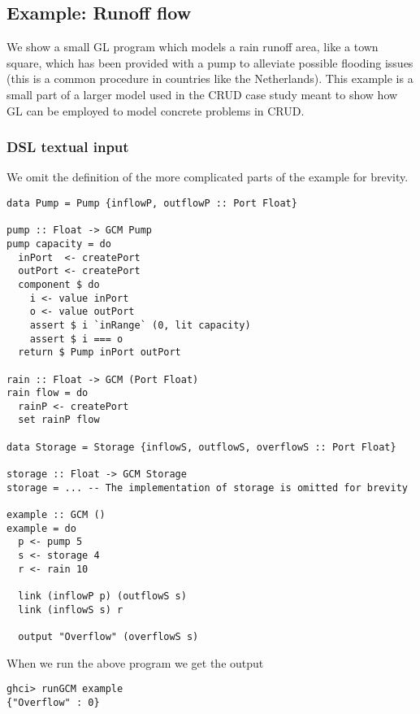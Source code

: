 \subsection{Example: Runoff flow}\label{example-runoff-flow}

We show a small GL program which models a rain runoff area, like a
town square, which has been provided with a pump to alleviate possible
flooding issues (this is a common procedure in countries like the
Netherlands).
%
This example is a small part of a larger model used in the CRUD case
study meant to show how GL can be employed to model concrete problems
in CRUD.

\subsubsection{DSL textual input}\label{example-runoff-flow-dsl-textual-input}

We omit the definition of the more complicated parts of the example
for brevity.




\begin{verbatim}
data Pump = Pump {inflowP, outflowP :: Port Float}

pump :: Float -> GCM Pump
pump capacity = do
  inPort  <- createPort
  outPort <- createPort
  component $ do
    i <- value inPort
    o <- value outPort
    assert $ i `inRange` (0, lit capacity)
    assert $ i === o
  return $ Pump inPort outPort

rain :: Float -> GCM (Port Float)
rain flow = do
  rainP <- createPort
  set rainP flow

data Storage = Storage {inflowS, outflowS, overflowS :: Port Float}

storage :: Float -> GCM Storage
storage = ... -- The implementation of storage is omitted for brevity

example :: GCM ()
example = do
  p <- pump 5
  s <- storage 4
  r <- rain 10

  link (inflowP p) (outflowS s)
  link (inflowS s) r

  output "Overflow" (overflowS s)
\end{verbatim}

When we run the above program we get the output

\begin{verbatim}
ghci> runGCM example
{"Overflow" : 0}
\end{verbatim}

